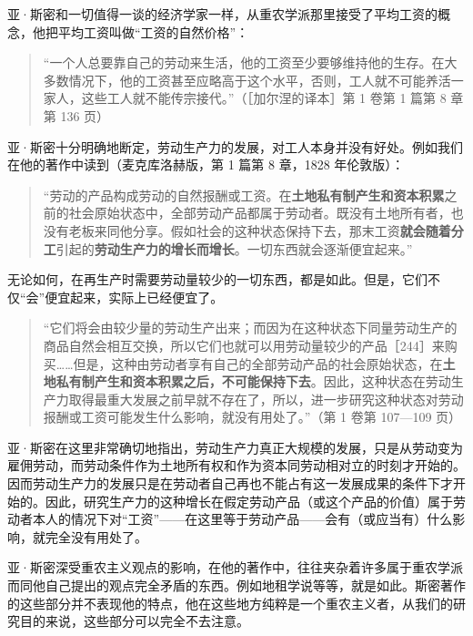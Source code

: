

亚·斯密和一切值得一谈的经济学家一样，从重农学派那里接受了平均工资的概念，他把平均工资叫做“工资的自然价格”：

\begin{quote}“一个人总要靠自己的劳动来生活，他的工资至少要够维持他的生存。在大多数情况下，他的工资甚至应略高于这个水平，否则，工人就不可能养活一家人，这些工人就不能传宗接代。”（［加尔涅的译本］第 1 卷第 1 篇第 8 章第 136 页）\end{quote}

亚·斯密十分明确地断定，劳动生产力的发展，对工人本身并没有好处。例如我们在他的著作中读到（麦克库洛赫版，第 1 篇第 8 章，1828 年伦敦版）：

\begin{quote}“劳动的产品构成劳动的自然报酬或工资。在\textbf{土地私有制产生和资本积累}之前的社会原始状态中，全部劳动产品都属于劳动者。既没有土地所有者，也没有老板来同他分享。假如社会的这种状态保持下去，那末工资\textbf{就会随着分工}引起的\textbf{劳动生产力的增长而增长}。一切东西就会逐渐便宜起来。”\end{quote}

\fontbox{~\{}无论如何，在再生产时需要劳动量较少的一切东西，都是如此。但是，它们不仅“会”便宜起来，实际上已经便宜了。\fontbox{\}~}

\begin{quote}“它们将会由较少量的劳动生产出来；而因为在这种状态下同量劳动生产的商品自然会相互交换，所以它们也就可以用劳动量较少的产品［244］来购买……但是，这种由劳动者享有自己的全部劳动产品的社会原始状态，在\textbf{土地私有制产生和资本积累之后，不可能保持下去}。因此，这种状态在劳动生产力取得最重大发展之前早就不存在了，所以，进一步研究这种状态对劳动报酬或工资可能发生什么影响，就没有用处了。”（第 1 卷第 107—109 页）\end{quote}

亚·斯密在这里非常确切地指出，劳动生产力真正大规模的发展，只是从劳动变为雇佣劳动，而劳动条件作为土地所有权和作为资本同劳动相对立的时刻才开始的。因而劳动生产力的发展只是在劳动者自己再也不能占有这一发展成果的条件下才开始的。因此，研究生产力的这种增长在假定劳动产品（或这个产品的价值）属于劳动者本人的情况下对“工资”——在这里等于劳动产品——会有（或应当有）什么影响，就完全没有用处了。

亚·斯密深受重农主义观点的影响，在他的著作中，往往夹杂着许多属于重农学派而同他自己提出的观点完全矛盾的东西。例如地租学说等等，就是如此。斯密著作的这些部分并不表现他的特点，他在这些地方纯粹是一个重农主义者，从我们的研究目的来说，这些部分可以完全不去注意。

